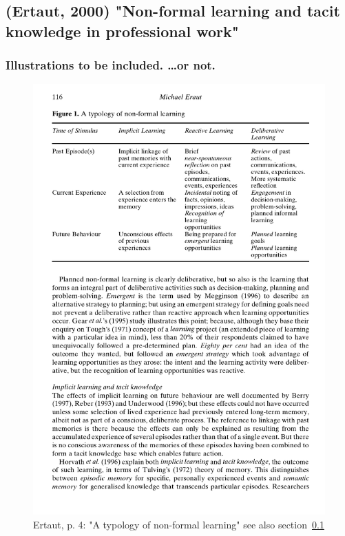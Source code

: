 \documentclass[12pt,a4paper]{article}
\begin{document}
  \subsection{(Ertaut, 2000) "Non-formal learning and tacit knowledge in professional work"} %
  \label{sec:Ertaut2000}

  \subsubsection{Illustrations to be included. …or not.}

    \begin{figure}[htb]
      \centering
      \includegraphics[width=12cm]{Meeting 4 NON-FORMAL LEARNING - Seite 4.pdf}
      \caption{Ertaut, p. 4: "A typology of non-formal learning" see also section~\ref{sec:Ertaut2000}}
      \label{fig:Ertaut typology}
    \end{figure}
\end{document}
